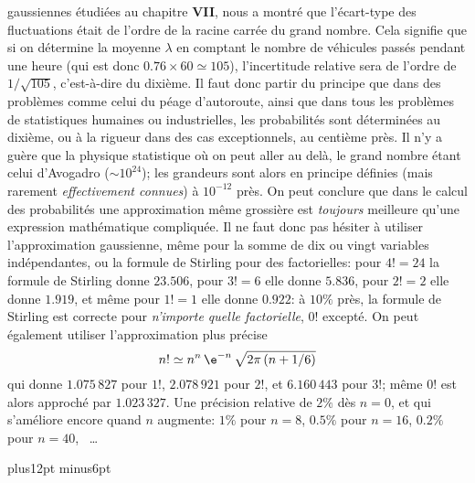 gaussiennes \'etudi\'ees au chapitre {\bf VII},  nous a montr\'e que  
l'\'ecart-type des fluctuations \'etait de l'ordre de la racine carr\'ee  
du grand nombre.  Cela signifie que si on d\'etermine la moyenne 
$\lambda$ en comptant le nombre de v\'ehicules pass\'es pendant une 
heure (qui est donc $0.76 \times 60 \simeq105$),  l'incertitude relative 
sera de l'ordre de $1 / \sqrt{105}$,  c'est-\`a-dire du dixi\`eme. 
\medskip  
Il faut donc partir du principe que dans des probl\`emes comme celui du 
p\'eage d'autoroute,  ainsi que dans tous les probl\`emes de statistiques 
humaines ou industrielles,  les probabilit\'es sont d\'etermin\'ees au 
dixi\`eme,  ou \`a la rigueur dans des cas exceptionnels,  au centi\`eme 
pr\`es.  Il n'y a gu\`ere que la physique statistique o\`u on peut aller au 
del\`a,  le grand nombre \'etant celui d'Avogadro ($\sim 10^{24}$);  les 
grandeurs sont alors en principe d\'efinies (mais rarement {\it 
effectivement connues}) \`a $10^{-12}$ pr\`es.   
\medskip 
On peut conclure que dans le calcul des probabilit\'es une approximation 
m\^eme grossi\`ere est {\it toujours} meilleure qu'une expression 
math\'ematique compliqu\'ee.  Il ne faut donc pas h\'esiter \`a utiliser 
l'approximation gaus\-sienne,  m\^eme pour la somme de dix ou vingt 
variables ind\'ependantes,  ou la formule de Stirling pour des factorielles: 
pour $4! = 24$ la formule de Stirling donne $23.506$,  pour $3! = 6$ elle
donne $5.836$,  pour $2! = 2$ elle donne $1.919$,  et m\^eme pour $1! = 1$
elle donne $0.922$:  \`a $10\%$ pr\`es,  la formule de Stirling est correcte
pour {\it n'importe quelle factorielle},  $0!$ except\'e. 
\medskip
On peut \'egalement utiliser l'approximation plus pr\'ecise
$$n! \simeq n^n\, \e^{-n}\, \sqrt{2\pi\, (n + 1/6)}$$
qui donne $1.075\, 827$ pour $1!$,  $2.078\, 921$ pour $2!$, 
et $6.160\, 443$ pour $3!$;  m\^eme $0!$ est alors approch\'e par
$1.023\, 327$.  Une pr\'ecision relative de $2\%$ d\`es $n=0$, 
et qui s'am\'eliore encore quand $n$ augmente: \hskip7pt $1\%$ pour
$n=8$,\hskip10pt $0.5\%$ pour $n=16$,\hskip10pt $0.2\%$ pour $n=40$, \ \dots

\vskip14pt plus12pt minus6pt
 
